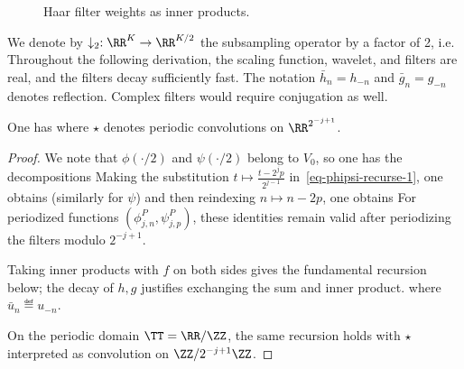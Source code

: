 \begin{figure}[tbp]
\centering
{}
\caption{Haar filter weights as inner products.}
\label{fig-haar-inner}
\end{figure}


We denote by $\downarrow_2 : \RR^K \rightarrow \RR^{K/2}$ the subsampling operator by a factor of 2, i.e.
Throughout the following derivation, the scaling function, wavelet, and filters are real, and the filters decay sufficiently fast. The notation $\bar h_n=h_{-n}$ and $\bar g_n=g_{-n}$ denotes reflection. Complex filters would require conjugation as well.

\begin{prop}
One has
where $\star$ denotes periodic convolutions on $\RR^{2^{-j+1}}$.
\end{prop}

\begin{proof}
We note that $\phi(\cdot/2)$ and $\psi(\cdot/2)$ belong to $V_0$, so one has the decompositions
Making the substitution $t \mapsto \frac{t-2^j p}{2^{j-1}}$ in~\eqref{eq-phipsi-recurse-1}, one obtains
(similarly for $\psi$) and then reindexing $n \mapsto n-2p$, one obtains
For periodized functions $(\phi_{j,n}^P,\psi_{j,p}^P)$, these identities remain valid after periodizing the filters modulo $2^{-j+1}$.
 
Taking inner products with $f$ on both sides gives the fundamental recursion below; the decay of $h,g$ justifies exchanging the sum and inner product.
where $\bar u_n \eqdef u_{-n}$. 
 
On the periodic domain $\TT=\RR/\ZZ$, the same recursion holds with $\star$ interpreted as convolution on $\ZZ/2^{-j+1}\ZZ$.
\end{proof}

